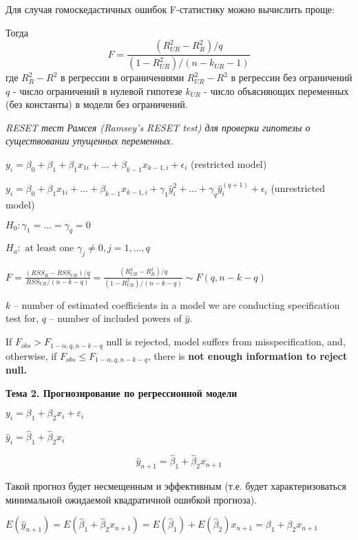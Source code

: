 \documentclass[a4paper,8pt]{article} %
\begin{document}
Для случая гомоскедастичных ошибок F-статистику
можно вычислить проще:



Тогда
$$
F=\frac{\left(R_{U R}^{2}-R_{R}^{2}\right) / q}{\left(1-R_{U R}^{2}\right) /\left(n-k_{U R}-1\right)}
$$
где
$R_{R}^{2}-R^{2}$ в регрессии в ограничениями
$R_{U R}^{2}-R^{2}$ в регрессии без ограничений $q$ - число ограничений в нулевой гипотезе $k_{U R}$ - число объясняющих переменных (без константы) в модели без ограничений.



\textit{RESET  тест  Рамсея  (Ramsey's  RESET  test)  для проверки гипотезы о существовании упущенных переменных.}

	$y_i = \beta_0 +  \beta_1 +  \beta_1 x_{1i} + \dots  +  \beta_{k-1} x_{k-1,i} + \epsilon_i $  (restricted model)

$y_i = \beta_0 +  \beta_1 x_{1i} + \dots  +  \beta_{k-1} x_{k-1,i}  + \gamma_1 \hat{y}^2_i + \dots + \gamma_q \hat{y}^{(q+1)}_i    +  \epsilon_i $  (unrestricted model)


$H_0: \gamma_1 = \dots = \gamma_q = 0  $

$H_a: \text{ at least one } \gamma_j \neq 0, j=1,\dots,q  $


$F=\frac{\left( RSS_{R}-RSS_{UR}\right) / q}{RSS_{UR} /(n-k-q)}=\frac{\left( R^2_{UR}-R^2_{R}\right) / q}{(1- R^2_{UR}) /(n-k-q)} \sim F(q,n-k-q) $

$k$  --   number of estimated coefficients in a model we are conducting specification test for, 	
$q$ -- number of included powers of $\hat{y}$.

If $F_{obs}>F_{1-\alpha, q, n-k-q}$  null is rejected, model suffers from misspecification, and, otherwise,  if $F_{obs}\leq F_{1-\alpha, q, n-k-q}$, there is \textbf{not enough information to reject null.   }



\newpage


\textbf{Тема 2. Прогнозирование по регрессионной модели }

$y_{i}=\beta_{1}+\beta_{2} x_{i}+\varepsilon_{i}$


$\hat{y}_{i}=\hat{\beta}_{1}+\hat{\beta}_{2} x_{i}$

$$
\hat{y}_{n+1}=\hat{\beta}_{1}+\hat{\beta}_{2} x_{n+1}
$$

Такой прогноз будет несмещенным и эффективным (т.е. будет характеризоваться минимальной ожидаемой квадратичной ошибкой прогноза).

$E\left(\hat{y}_{n+1}\right)=E\left(\hat{\beta}_{1}+\hat{\beta}_{2} x_{n+1}\right)=E\left(\hat{\beta}_{1}\right)+E\left(\hat{\beta}_{2}\right) x_{n+1}=\beta_{1}+\beta_{2} x_{n+1}$
\end{document}

